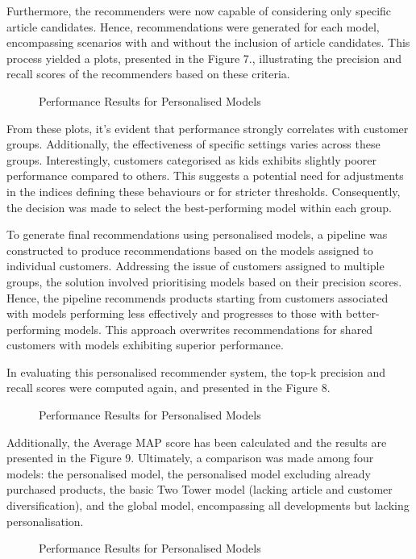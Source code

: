 \documentclass[conference,compsoc]{IEEEtran}
\begin{document}
Furthermore, the recommenders were now capable of considering only specific article candidates. Hence, recommendations were generated for each model, encompassing scenarios with and without the inclusion of article candidates. This process yielded a plots, presented in the Figure 7., illustrating the precision and recall scores of the recommenders based on these criteria.
\begin{figure}[htbp]
    \centering
    \caption{Performance Results for Personalised Models}
    \label{fig:example}
\end{figure}

From these plots, it's evident that performance strongly correlates with customer groups. Additionally, the effectiveness of specific settings varies across these groups. Interestingly, customers categorised as kids exhibits slightly poorer performance compared to others. This suggests a potential need for adjustments in the indices defining these behaviours or for stricter thresholds. Consequently, the decision was made to select the best-performing model within each group.

To generate final recommendations using personalised models, a pipeline was constructed to produce recommendations based on the models assigned to individual customers. Addressing the issue of customers assigned to multiple groups, the solution involved prioritising models based on their precision scores. Hence, the pipeline recommends products starting from customers associated with models performing less effectively and progresses to those with better-performing models. This approach overwrites recommendations for shared customers with models exhibiting superior performance.

In evaluating this personalised recommender system, the top-k precision and recall scores were computed again, and presented in the Figure 8.
\begin{figure}[htbp]
    \centering
    \caption{Performance Results for Personalised Models}
    \label{fig:example}
\end{figure}
Additionally, the Average MAP score has been calculated and the results are presented in the Figure 9. Ultimately, a comparison was made among four models: the personalised model, the personalised model excluding already purchased products, the basic Two Tower model (lacking article and customer diversification), and the global model, encompassing all developments but lacking personalisation.
\begin{figure}[htbp]
    \centering
    \caption{Performance Results for Personalised Models}
    \label{fig:example}
\end{figure}
\end{document}
